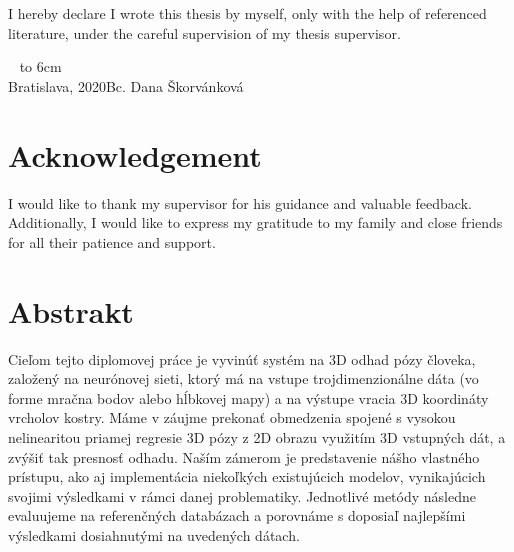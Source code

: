 \documentclass[12pt, a4paper, oneside]{book}
\newcommand\mfauthor{Bc. Dana Škorvánková}
\newcommand\mfplacedate{Bratislava, 2020}
\begin{document}

%
%
%




{~}\vspace{12cm}

\noindent
\begin{minipage}{0.25\textwidth}~\end{minipage}
\begin{minipage}{0.75\textwidth}
I hereby declare I wrote this thesis by myself, only with the help of
referenced literature, under the careful supervision of my thesis
supervisor.
\newline \newline
\end{minipage}
\vfill
~ \hfill {\hbox to 6cm{\dotfill}} \\
\mfplacedate \hfill \mfauthor
\vfill\eject 


\chapter*{Acknowledgement}\label{chap:thank_you}
I would like to thank my supervisor for his guidance and valuable feedback. Additionally, I would like to express my gratitude to
my family and close friends for all their patience and support.

\chapter*{Abstrakt}\label{chap:abstract_sk}
Cieľom tejto diplomovej práce je vyvinúť systém na 3D odhad pózy človeka, založený na neurónovej sieti, ktorý má na vstupe trojdimenzionálne dáta (vo forme mračna bodov alebo hĺbkovej mapy) a na výstupe vracia 3D koordináty vrcholov kostry. Máme v záujme prekonať obmedzenia spojené s vysokou nelinearitou priamej regresie 3D pózy z 2D obrazu využitím 3D vstupných dát, a zvýšiť tak presnosť odhadu. Naším zámerom je predstavenie nášho vlastného prístupu, ako aj implementácia niekoľkých existujúcich modelov, vynikajúcich svojimi výsledkami v rámci danej problematiky. Jednotlivé metódy následne evaluujeme na referenčných databázach a porovnáme s doposiaľ najlepšími výsledkami dosiahnutými na uvedených dátach.
\end{document}
